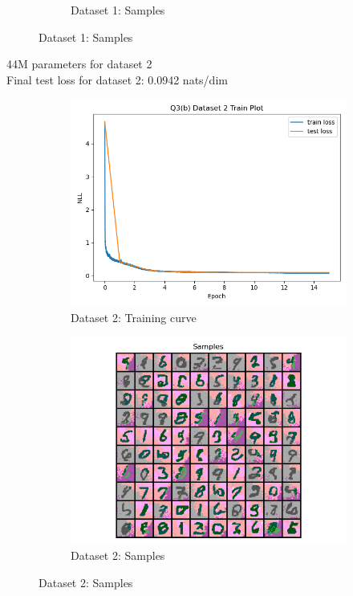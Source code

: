 \documentclass{article}
\begin{document}
\begin{enumerate}[(a)]
\begin{figure}[H]
\begin{subfigure}{0.45\textwidth}
        \caption{Dataset 1: Samples}
    \end{subfigure}
\end{figure}
44M parameters for dataset 2 \\
Final test loss for dataset 2: 0.0942 nats/dim
\begin{figure}[H]
    \centering
    \begin{subfigure}{0.45\textwidth}
        \centering
        \includegraphics[width=\textwidth]{figures/q3_b_dset2_train_plot.png}
        \caption{Dataset 2: Training curve}
    \end{subfigure}
    \hspace{0.2in}
    \begin{subfigure}{0.45\textwidth}
        \centering
        \includegraphics[width=\textwidth]{figures/q3_b_dset2_samples.png}
        \caption{Dataset 2: Samples}
    \end{subfigure}
\end{figure}


\end{enumerate}
\end{document}
